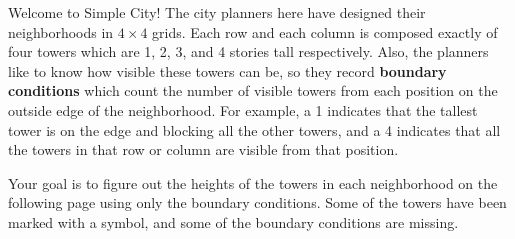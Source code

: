 
\begin{puzzle}
Welcome to Simple City! The city planners here have
designed their neighborhoods in \(4\times 4\) grids. Each row and each column
is composed exactly of four towers which are 1, 2, 3, and 4 stories tall
respectively. Also, the planners like to know how visible these towers
can be, so they record \textbf{boundary conditions} which count the number
of visible towers from each position on the outside edge of the neighborhood.
For example, a 1 indicates that the tallest tower is on the edge and blocking
all the other towers, and a 4 indicates that all the towers in that row or
column are visible from that position.

\vfill

\begin{center}
\end{center}

\vfill

Your goal is to figure out the heights of the towers
in each neighborhood on the following page using only the boundary
conditions.
Some of the towers have been marked with a symbol,
and some of the boundary conditions are missing.


\end{puzzle}
